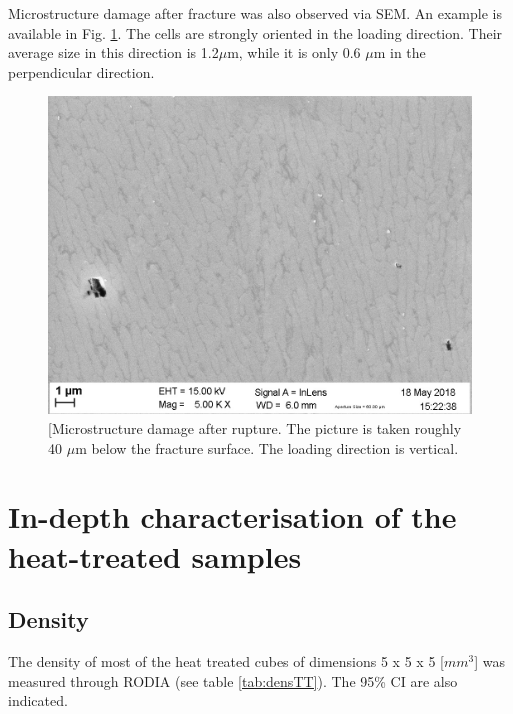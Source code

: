 Microstructure damage after fracture was also observed via SEM. An example is available in Fig. \ref{fig:ms_ab_dmg}. The cells are strongly oriented in the loading direction. Their average size in this direction is 1.2$\mu$m, while it is only 0.6 $\mu$m in the perpendicular direction.\\

\begin{figure}[ht]
	\centering
	\centerline{\includegraphics[scale=0.35]{Images/dmg-01-03.jpg}}
	\decoRule
	\caption[Microstructure damage after rupture. The picture is taken roughly 40 $\mu$m below the fracture surface. The loading direction is vertical]{[Microstructure damage after rupture. The picture is taken roughly 40 $\mu$m below the fracture surface. The loading direction is vertical.}
	\label{fig:ms_ab_dmg}
\end{figure}

\section{In-depth characterisation of the heat-treated samples}
\label{RCHTS}

\subsection{Density}
The density of most of the heat treated cubes of dimensions 5 x 5 x 5 [$mm^3$] was measured through RODIA (see table \ref{tab:densTT}). The 95\% CI are also indicated.\\


